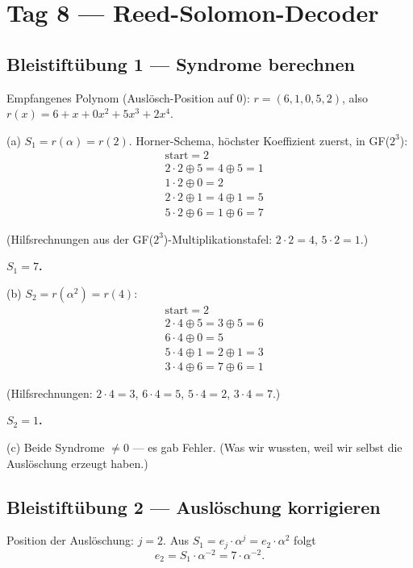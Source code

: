 \section{Tag 8 — Reed-Solomon-Decoder}

\subsection*{Bleistiftübung 1 — Syndrome berechnen}

Empfangenes Polynom (Auslösch-Position auf 0):
$r = (6, 1, 0, 5, 2)$, also $r(x) = 6 + x + 0 x^2 + 5 x^3 + 2 x^4$.

(a) $S_1 = r(\alpha) = r(2)$. Horner-Schema, höchster Koeffizient
zuerst, in GF($2^3$):
\begin{align*}
  &\text{start} = 2 \\
  &2 \cdot 2 \oplus 5 = 4 \oplus 5 = 1 \\
  &1 \cdot 2 \oplus 0 = 2 \\
  &2 \cdot 2 \oplus 1 = 4 \oplus 1 = 5 \\
  &5 \cdot 2 \oplus 6 = 1 \oplus 6 = 7
\end{align*}

(Hilfsrechnungen aus der GF($2^3$)-Multiplikationstafel:
$2 \cdot 2 = 4$, $5 \cdot 2 = 1$.)

\textbf{$S_1 = 7$.}

(b) $S_2 = r(\alpha^2) = r(4)$:
\begin{align*}
  &\text{start} = 2 \\
  &2 \cdot 4 \oplus 5 = 3 \oplus 5 = 6 \\
  &6 \cdot 4 \oplus 0 = 5 \\
  &5 \cdot 4 \oplus 1 = 2 \oplus 1 = 3 \\
  &3 \cdot 4 \oplus 6 = 7 \oplus 6 = 1
\end{align*}

(Hilfsrechnungen: $2 \cdot 4 = 3$, $6 \cdot 4 = 5$, $5 \cdot 4 = 2$,
$3 \cdot 4 = 7$.)

\textbf{$S_2 = 1$.}

(c) Beide Syndrome $\ne 0$ — es gab Fehler. (Was wir wussten, weil
wir selbst die Auslöschung erzeugt haben.)

\subsection*{Bleistiftübung 2 — Auslöschung korrigieren}

Position der Auslöschung: $j = 2$. Aus
$S_1 = e_j \cdot \alpha^j = e_2 \cdot \alpha^2$ folgt
\[
  e_2 = S_1 \cdot \alpha^{-2} = 7 \cdot \alpha^{-2}.
\]

